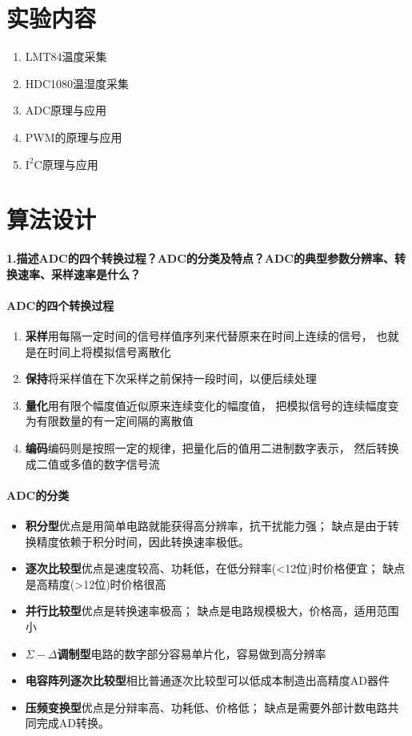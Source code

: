 \documentclass[a4paper]{ctexart}
\begin{document}
  \section{实验内容}
    \begin{enumerate}
      \item LMT84温度采集
      \item HDC1080温湿度采集
      \item ADC原理与应用
      \item PWM的原理与应用
      \item $\mathrm{I^2C}$原理与应用
    \end{enumerate}

  \section{算法设计}
    \paragraph{1.描述ADC的四个转换过程？ADC的分类及特点？ADC的典型参数分辨率、转换速率、采样速率是什么？}
    \paragraph{ADC的四个转换过程}
    \begin{enumerate}
      \item \textbf{采样}\quad 用每隔一定时间的信号样值序列来代替原来在时间上连续的信号，
      也就是在时间上将模拟信号离散化
      \item \textbf{保持}\quad 将采样值在下次采样之前保持一段时间，以便后续处理
      \item \textbf{量化}\quad 用有限个幅度值近似原来连续变化的幅度值，
      把模拟信号的连续幅度变为有限数量的有一定间隔的离散值
      \item \textbf{编码}\quad 编码则是按照一定的规律，把量化后的值用二进制数字表示，
      然后转换成二值或多值的数字信号流
    \end{enumerate}

    \paragraph{ADC的分类}
    \begin{itemize}
      \item \textbf{积分型}\quad 优点是用简单电路就能获得高分辨率，抗干扰能力强；
      缺点是由于转换精度依赖于积分时间，因此转换速率极低。
      \item \textbf{逐次比较型}\quad 优点是速度较高、功耗低，在低分辩率(<12位)时价格便宜；
      缺点是高精度(>12位)时价格很高
      \item \textbf{并行比较型}\quad 优点是转换速率极高；
      缺点是电路规模极大，价格高，适用范围小
      \item \textbf{$\Sigma-\Delta$调制型}\quad 电路的数字部分容易单片化，容易做到高分辨率
      \item \textbf{电容阵列逐次比较型}\quad 相比普通逐次比较型可以低成本制造出高精度AD器件
      \item \textbf{压频变换型}\quad 优点是分辩率高、功耗低、价格低；
      缺点是需要外部计数电路共同完成AD转换。
    \end{itemize}
\end{document}
